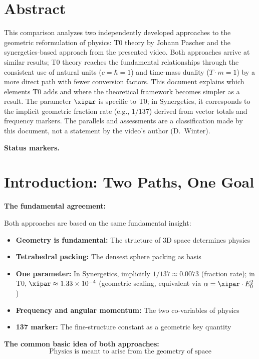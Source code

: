 \section*{Abstract}
		This comparison analyzes two independently developed approaches to the geometric reformulation of physics: T0 theory by Johann Pascher and the synergetics-based approach from the presented video. Both approaches arrive at similar results; T0 theory reaches the fundamental relationships through the consistent use of natural units ($c = \hbar = 1$) and time-mass duality ($T \cdot m = 1$) by a more direct path with fewer conversion factors. This document explains which elements T0 adds and where the theoretical framework becomes simpler as a result. The parameter $\xipar$ is specific to T0; in Synergetics, it corresponds to the implicit geometric fraction rate (e.g., $1/137$) derived from vector totals and frequency markers. The parallels and assessments are a classification made by this document, not a statement by the video's author (D.~Winter).

	\medskip\noindent\textbf{Status markers.}
	

	
	
	\section{Introduction: Two Paths, One Goal}
	
	\begin{gemeinsam}
		\textbf{The fundamental agreement:}
		
		Both approaches are based on the same fundamental insight:
		\begin{itemize}
			\item \textbf{Geometry is fundamental:} The structure of 3D space determines physics
			\item \textbf{Tetrahedral packing:} The densest sphere packing as basis
			\item \textbf{One parameter:} In Synergetics, implicitly $1/137 \approx 0.0073$ (fraction rate); in T0, $\xipar \approx 1.33 \times 10^{-4}$ (geometric scaling, equivalent via $\alpha = \xipar \cdot E_0^2$)
			\item \textbf{Frequency and angular momentum:} The two co-variables of physics
			\item \textbf{137 marker:} The fine-structure constant as a geometric key quantity
		\end{itemize}
		
		\textbf{The common basic idea of both approaches:}
		\begin{equation}
			\boxed{\text{Physics is meant to arise from the geometry of space}}
		\end{equation}
	\end{gemeinsam}
	
